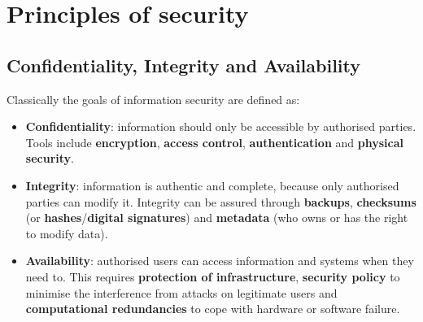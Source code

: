 \documentclass[final]{article}
\begin{document}
\tableofcontents
\pagebreak

\section{Principles of security}

\subsection{Confidentiality, Integrity and Availability}
Classically the goals of information security are defined as:
\begin{itemize}
	\item \textbf{Confidentiality}: information should only be accessible by authorised parties. Tools include \textbf{encryption}, \textbf{access control}, \textbf{authentication} and \textbf{physical security}.
	\item \textbf{Integrity}: information is authentic and complete, because only authorised parties can modify it. Integrity can be assured through \textbf{backups}, \textbf{checksums} (or \textbf{hashes}/\textbf{digital signatures}) and \textbf{metadata} (who owns or has the right to modify data).
	\item \textbf{Availability}: authorised users can access information and systems when they need to. This requires \textbf{protection of infrastructure}, \textbf{security policy} to minimise the interference from attacks on legitimate users and \textbf{computational redundancies} to cope with hardware or software failure.
\end{itemize}
\end{document}
